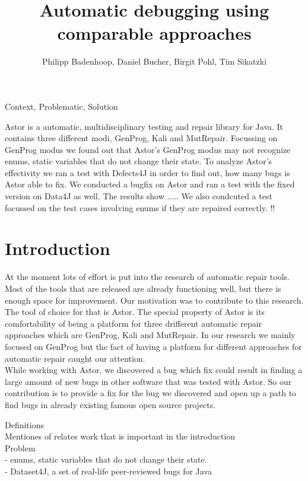 \documentclass[pdftex,english,oribibl]{llncs}
\title{Automatic debugging using comparable approaches}
\author{Philipp Badenhoop, Daniel Bucher, Birgit Pohl, Tim Sikatzki}
\institute{Humboldt University of Berlin\\Department of Computer Science\\12489 Berlin, Germany}
\makeatletter
\gdef\@keywords{}
\renewenvironment{abstract}{%
  \list{}{\advance\topsep by0.35cm\relax\small%
          \leftmargin=1cm%
          \labelwidth=\z@%
          \listparindent=\z@%
          \itemindent\listparindent%
          \rightmargin\leftmargin}%
          \item[\hskip\labelsep\bfseries\abstractname]}{%
  \if!\@keywords!\else{\item[~]\item[\hskip\labelsep\bfseries\keywordname]\@keywords}\fi%
  \endlist}
\makeatother
\begin{document}
\maketitle

\begin{abstract}
  Context, Problematic, Solution

Astor is a automatic, multidisciplinary testing and repair library for Java. It contains three different modi, GenProg, Kali and MutRepair. Focussing on GenProg modus we found out that Astor's GenProg modus may not recognize enums, static variables that do not change their state.
To analyze Astor's effectivity we ran a test with Defects4J in order to find out, how many bugs is Astor able to fix. We conducted a bugfix on Astor and ran a test with the fixed version on Data4J as well. The results show .....
We also condcuted a test focussed on the test cases involving enums if they are repaired correctly.
\end{abstract}

\section{Introduction}
At the moment lots of effort is put into the research of automatic repair tools. Most of the tools that are released are already functioning well, but there is enough space for improvement. Our motivation was to contribute to this research.\\
The tool of choice for that is Astor. The special property of Astor is its comfortability of being a platform for three drifferent automatic repair approaches which are GenProg, Kali and MutRepair. In our research we mainly focused on GenProg but the fact of having a platform for different approaches for automatic repair caught our attention.\\
While working with Astor, we discovered a bug which fix could result in finding a large amount of new bugs in other software that was tested with Astor.
So our contribution is to provide a fix for the bug we discovered and open up a path to find bugs in already existing famous open source projects.


Definitions\\
Mentiones of relates work that is important in the introduction\\
Problem\\
- enums, static variables that do not change their state.\\
-  Dataset4J, a set of real-life peer-reviewed bugs for Java\\
\end{document}
